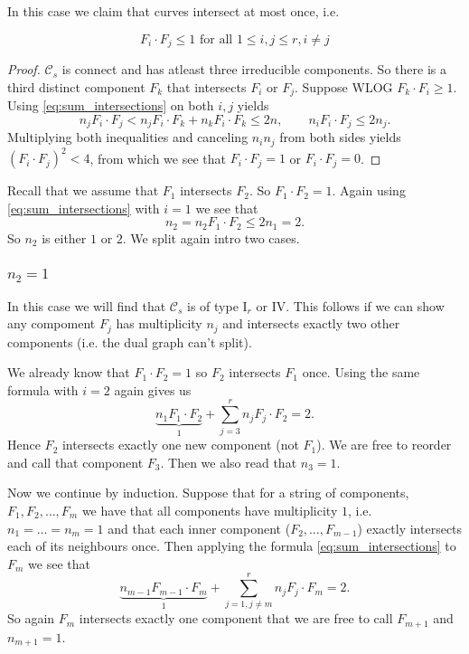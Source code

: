 \documentclass[a4paper]{article}
\begin{document}
In this case we claim that curves intersect at most once, i.e. 
\begin{claim}
\[
	F_i \cdot F_j \le 1 \text{ for all }  1 \le i, j \le r, i \ne j
\]
\end{claim}
\begin{proof}
	$\mathcal{C} _s$ is connect and has atleast three irreducible components. 
	So there is a third distinct component $F_k$ that intersects $F_i$ or $F_j$. Suppose WLOG $F_k \cdot F_i \ge 1$. 
	Using \eqref{eq:sum_intersections} on both  $i, j$ yields \[
	n_j F_i \cdot F_j < n_j F_i \cdot  F_k + n_k F_i \cdot  F_k \le 2n, \qquad n_i F_i \cdot F_j \le 2 n_j
	.\] 
	Multiplying both inequalities and canceling $n_i n_j$ from both sides yields $(F_i \cdot  F_j)^2 < 4$, from which we see that $F_i \cdot  F_j = 1$ or $F_i \cdot F_j = 0$. 
\end{proof}

Recall that we assume that $F_1$ intersects $F_2$. So $F_1 \cdot  F_2 = 1$. 
Again using  \eqref{eq:sum_intersections} with $i = 1$ we see that \[
n_2 = n_2 F_1 \cdot F_2 \le 2n_1 = 2
.\] 
So $n_2$ is either $1$ or $2$. We split again intro two cases. 
\subsubsection{$n_2 = 1$} 
In this case we will find that $\mathcal{C} _s$ is of type $\text{I}_r$ or $\text{IV}$. This follows if we can show any compoment $F_j$ has multiplicity $n_j$ and intersects exactly two other components (i.e. the dual graph can't split). 

We already know that $F_1 \cdot F_2 = 1$ so $F_2$ intersects $F_1$ once. Using the same formula with $i = 2$ again gives us \[
	\underbrace{n_1 F_1\cdot F_2}_{1} + \sum_{j = 3}^{r}  n_j F_j \cdot F_2 = 2
.\] 
Hence $F_2$ intersects exactly one new component (not $F_1$). We are free to reorder and call that component $F_3$. Then we also read that $n_3 = 1$.  

Now we continue by induction. Suppose that for a string of components, $F_1, F_2, \ldots, F_m$ we have that all components have multiplicity $1$, i.e.\ $n_1 = \ldots = n_{m} = 1$ and that each inner component ($F_2, \ldots, F_{m -1}$) exactly intersects each of its neighbours once. 
Then applying the formula \eqref{eq:sum_intersections} to $F_m$ we see that \[
	\underbrace{n_{m -1} F_{m - 1} \cdot F_m}_1 + \sum_{j= 1, j\ne m}^{r} n_j F_j \cdot F_m  = 2
.\] 
So again $F_m$ intersects exactly one component that we are free to call $F_{m + 1}$ and $n_{m + 1} = 1$. 
\end{document}
